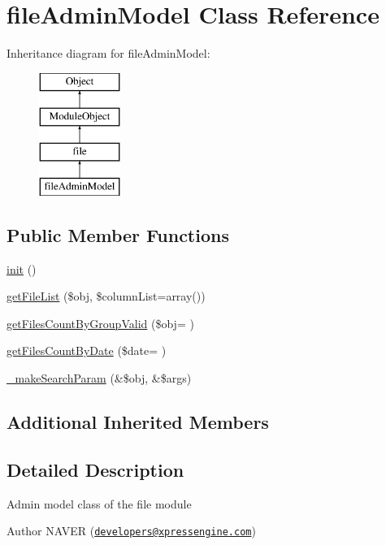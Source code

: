 \hypertarget{classfileAdminModel}{}\section{file\+Admin\+Model Class Reference}
\label{classfileAdminModel}
Inheritance diagram for file\+Admin\+Model\+:\begin{figure}[H]
\begin{center}
\leavevmode
\includegraphics[height=4.000000cm]{classfileAdminModel}
\end{center}
\end{figure}
\subsection*{Public Member Functions}
\begin{DoxyCompactItemize}
\item 
\hyperlink{classfileAdminModel_a043ae7934f6fb3bb6ef24bff36a63795}{init} ()
\item 
\hyperlink{classfileAdminModel_a19433395ef400eaf33876d93db918a29}{get\+File\+List} (\$obj, \$column\+List=array())
\item 
\hyperlink{classfileAdminModel_a0523b70f599166913414c375318bcc83}{get\+Files\+Count\+By\+Group\+Valid} (\$obj= \textquotesingle{}\textquotesingle{})
\item 
\hyperlink{classfileAdminModel_a2cff52618c56e1ebae4e392646c859e8}{get\+Files\+Count\+By\+Date} (\$date= \textquotesingle{}\textquotesingle{})
\item 
\hyperlink{classfileAdminModel_a2da869c66512ff677a71674030c8637c}{\+\_\+make\+Search\+Param} (\&\$obj, \&\$args)
\end{DoxyCompactItemize}
\subsection*{Additional Inherited Members}


\subsection{Detailed Description}
Admin model class of the file module \begin{DoxyAuthor}{Author}
N\+A\+V\+ER (\href{mailto:developers@xpressengine.com}{\tt developers@xpressengine.\+com}) 
\end{DoxyAuthor}


